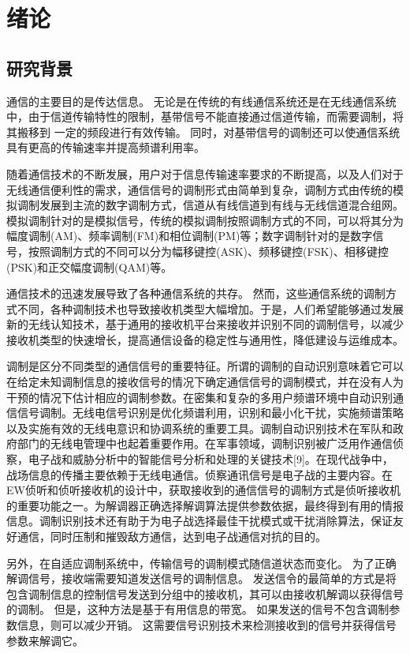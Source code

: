 
\chapter{绪论}
\section{研究背景}
通信的主要目的是传达信息。 无论是在传统的有线通信系统还是在无线通信系统中，由于信道传输特性的限制，基带信号不能直接通过信道传输，而需要调制，将其搬移到 一定的频段进行有效传输。 同时，对基带信号的调制还可以使通信系统具有更高的传输速率并提高频谱利用率。\par

随着通信技术的不断发展，用户对于信息传输速率要求的不断提高，以及人们对于无线通信便利性的需求，通信信号的调制形式由简单到复杂，调制方式由传统的模拟调制发展到主流的数字调制方式，信道从有线信道到有线与无线信道混合组网。模拟调制针对的是模拟信号，传统的模拟调制按照调制方式的不同，可以将其分为幅度调制(AM)、频率调制(FM)和相位调制(PM)等；数字调制针对的是数字信号，按照调制方式的不同可以分为幅移键控(ASK)、频移键控(FSK)、相移键控(PSK)和正交幅度调制(QAM)等。 \par

通信技术的迅速发展导致了各种通信系统的共存。 然而，这些通信系统的调制方式不同，各种调制技术也导致接收机类型大幅增加。于是，人们希望能够通过发展新的无线认知技术，基于通用的接收机平台来接收并识别不同的调制信号，以减少接收机类型的快速增长，提高通信设备的稳定性与通用性，降低建设与运维成本。 \par

调制是区分不同类型的通信信号的重要特征。所谓的调制的自动识别意味着它可以在给定未知调制信息的接收信号的情况下确定通信信号的调制模式，并在没有人为干预的情况下估计相应的调制参数。在密集和复杂的多用户频谱环境中自动识别通信信号调制。无线电信号识别是优化频谱利用，识别和最小化干扰，实施频谱策略以及实施有效的无线电意识和协调系统的重要工具。调制自动识别技术在军队和政府部门的无线电管理中也起着重要作用。在军事领域，调制识别被广泛用作通信侦察，电子战和威胁分析中的智能信号分析和处理的关键技术[9]。在现代战争中，战场信息的传播主要依赖于无线电通信。侦察通讯信号是电子战的主要内容。在EW侦听和侦听接收机的设计中，获取接收到的通信信号的调制方式是侦听接收机的重要功能之一。为解调器正确选择解调算法提供参数依据，最终得到有用的情报信息。调制识别技术还有助于为电子战选择最佳干扰模式或干扰消除算法，保证友好通信，同时压制和摧毁敌方通信，达到电子战通信对抗的目的。\par

另外，在自适应调制系统中，传输信号的调制模式随信道状态而变化。 为了正确解调信号，接收端需要知道发送信号的调制信息。 发送信令的最简单的方式是将包含调制信息的控制信号发送到分组中的接收机，其可以由接收机解调以获得信号的调制。 但是，这种方法是基于有用信息的带宽。 如果发送的信号不包含调制参数信息，则可以减少开销。 这需要信号识别技术来检测接收到的信号并获得信号参数来解调它。\par

